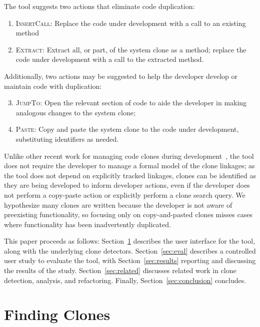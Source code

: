 \documentclass[nocopyrightspace,10pt]{sigplanconf}
\begin{document}
The tool suggests two actions that eliminate code duplication:

\begin{enumerate}
  \item \textsc{InsertCall}: Replace the code under development with a call to an existing method
  \item \textsc{Extract}: Extract all, or part, of the system clone as a method;
    replace the code under development with a call to the extracted
    method.
\end{enumerate}

\noindent Additionally, two actions may be suggested to help the developer
develop or maintain code with duplication:

\begin{enumerate}
\setcounter{enumi}{2}
  \item \textsc{JumpTo}: Open the relevant section of code to aide the
    developer in making analogous changes to the system clone;
  \item \textsc{Paste}: Copy and paste the system clone to the code under development,
    substituting identifiers as needed.
\end{enumerate}

Unlike other recent work for managing code clones during
development~\cite{deWit2009, Duala-Ekoko2007}, the tool does not
require the developer to manage a formal model of the clone linkages;
as the tool does not depend on explicitly tracked linkages, clones can
be identified as they are being developed to inform developer actions,
even if the developer does not perform a copy-paste action or
explicitly perform a clone search query.  We hypothesize many clones 
are written because the developer is not aware of preexisting functionality,
 so focusing only on copy-and-pasted clones
misses cases where functionality has been inadvertently 
duplicated.

This paper proceeds as follows: Section~\ref{sec:finding-clones}
describes the user interface for the tool, along with the underlying
clone detectors. Section~\ref{sec:eval} describes a controlled user
study to evaluate the tool, with Section~\ref{sec:results}
reporting and discussing the results of the study.
Section~\ref{sec:related} discusses
related work in clone detection, analysis, and refactoring. Finally,
Section~\ref{sec:conclusion} concludes.

\section{Finding Clones}
\label{sec:finding-clones}
\end{document}
